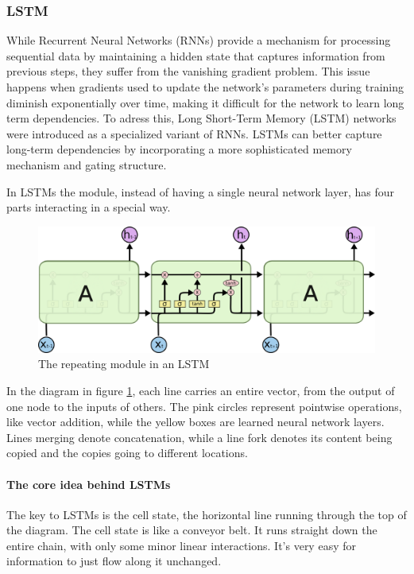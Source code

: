 \documentclass{article}
\begin{document}
\subsubsection{LSTM}
\label{sec:lstm}

While Recurrent Neural Networks (RNNs) provide a mechanism for processing sequential data by maintaining a hidden state that captures information from previous steps, they suffer from the vanishing gradient problem.
This issue happens when gradients used to update the network's parameters during training diminish exponentially over time, making it difficult for the network to learn long term dependencies.
To adress this, Long Short-Term Memory (LSTM) networks were introduced as a specialized variant of RNNs.
LSTMs can better capture long-term dependencies by incorporating a more sophisticated memory mechanism and gating structure.

In LSTMs the module, instead of having a single neural network layer, has four parts interacting in a special way.

\begin{figure}[htbp]
  \centering
  \includegraphics[width=0.8\linewidth]{img/lstm_chain.png}
  \caption{The repeating module in an LSTM}
  \label{fig:lstm_chain}
\end{figure}

In the diagram in figure \ref{fig:lstm_chain}, each line carries an entire vector, from the output of one node to the inputs of others.
The pink circles represent pointwise operations, like vector addition, while the yellow boxes are learned neural network layers.
Lines merging denote concatenation, while a line fork denotes its content being copied and the copies going to different locations.

\paragraph{The core idea behind LSTMs}

The key to LSTMs is the cell state, the horizontal line running through the top of the diagram.
The cell state is like a conveyor belt. It runs straight down the entire chain, with only some minor linear interactions.
It's very easy for information to just flow along it unchanged.
\end{document}
